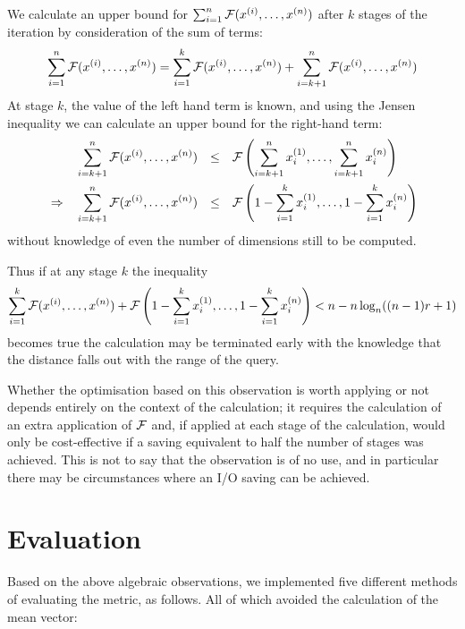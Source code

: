 We calculate an upper bound for $\sum_{i = 1}^n  \mathcal{F}(x^{(i)},\ldots, x^{(n)})$ after $k$ stages of the iteration by consideration of the sum of terms:
\begin{equation}
\sum_{i = 1}^n  \mathcal{F}(x^{(i)},\ldots, x^{(n)}) = \sum_{i = 1}^k  \mathcal{F}(x^{(i)},\ldots, x^{(n)}) + \sum_{i = k+1}^n  \mathcal{F}(x^{(i)},\ldots, x^{(n)})
\end{equation}
At stage $k$, the value of the left hand term is known, and using the Jensen inequality we can calculate an upper bound for the right-hand term:
\begin{align}\label{equation_threshold}
&& &\sum_{i=k+1}^n  \mathcal{F}(x^{(i)},\ldots, x^{(n)}) & \le & &  &\mathcal{F}\left(\sum_{i=k+1}^n x^{(1)}_i,\ldots,\sum_{i=k+1}^n x^{(n)}_i\right)\\
&\Rightarrow& &\sum_{i=k+1}^n  \mathcal{F}(x^{(i)},\ldots, x^{(n)}) & \le & & &\mathcal{F}\left(1 - \sum_{i=1}^k x^{(1)}_i,\ldots, 1 - \sum_{i=1}^k x^{(n)}_i \right)
\end{align}
without knowledge of even the number of dimensions still to be computed.

Thus if at any stage $k$ the inequality
\begin{equation}
\sum_{i = 1}^k  \mathcal{F}(x^{(i)},\ldots, x^{(n)}) + \mathcal{F}\left(1 - \sum_{i=1}^k x^{(1)}_i,\ldots, 1 - \sum_{i=1}^k x^{(n)}_i \right) < n -  n\log_n((n - 1)r + 1)
\end{equation}
becomes true the calculation may be terminated early with the knowledge that the distance falls out with the range of the query.

Whether the optimisation based on this observation is worth applying or not depends entirely on the context of the calculation; it requires the calculation of an extra application of $\mathcal{F}$ and, if applied at each stage of the calculation, would only be cost-effective if a saving equivalent to half the number of stages was achieved. This is not to say that the observation is of no use, and in particular there may be circumstances where an I/O saving can be achieved.

\section{Evaluation}
\label{section_evaluation}
Based on the above algebraic observations, we implemented five different methods of evaluating the metric, as follows.  All of which avoided the calculation of the mean vector:

